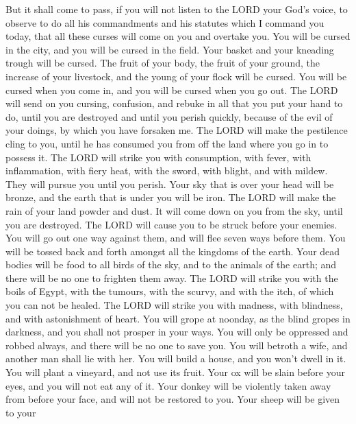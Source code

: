  But it shall come to pass, if you will not listen to the
LORD your God's voice, to observe to do all his commandments and his
statutes which I command you today, that all these curses will come on
you and overtake you.  You will be cursed in the city,
and you will be cursed in the field.  Your basket and
your kneading trough will be cursed.  The fruit of your
body, the fruit of your ground, the increase of your livestock, and the
young of your flock will be cursed.  You will be cursed
when you come in, and you will be cursed when you go out.
 The LORD will send on you cursing, confusion, and rebuke
in all that you put your hand to do, until you are destroyed and until
you perish quickly, because of the evil of your doings, by which you
have forsaken me.  The LORD will make the pestilence
cling to you, until he has consumed you from off the land where you go
in to possess it.  The LORD will strike you with
consumption, with fever, with inflammation, with fiery heat, with the
sword, with blight, and with mildew. They will pursue you until you
perish.  Your sky that is over your head will be bronze,
and the earth that is under you will be iron.  The LORD
will make the rain of your land powder and dust. It will come down on
you from the sky, until you are destroyed.  The LORD will
cause you to be struck before your enemies. You will go out one way
against them, and will flee seven ways before them. You will be tossed
back and forth amongst all the kingdoms of the earth. 
Your dead bodies will be food to all birds of the sky, and to the
animals of the earth; and there will be no one to frighten them away.
 The LORD will strike you with the boils of Egypt, with
the tumours, with the scurvy, and with the itch, of which you can not be
healed.  The LORD will strike you with madness, with
blindness, and with astonishment of heart.  You will
grope at noonday, as the blind gropes in darkness, and you shall not
prosper in your ways. You will only be oppressed and robbed always, and
there will be no one to save you.  You will betroth a
wife, and another man shall lie with her. You will build a house, and
you won't dwell in it. You will plant a vineyard, and not use its fruit.
 Your ox will be slain before your eyes, and you will not
eat any of it. Your donkey will be violently taken away from before your
face, and will not be restored to you. Your sheep will be given to your
